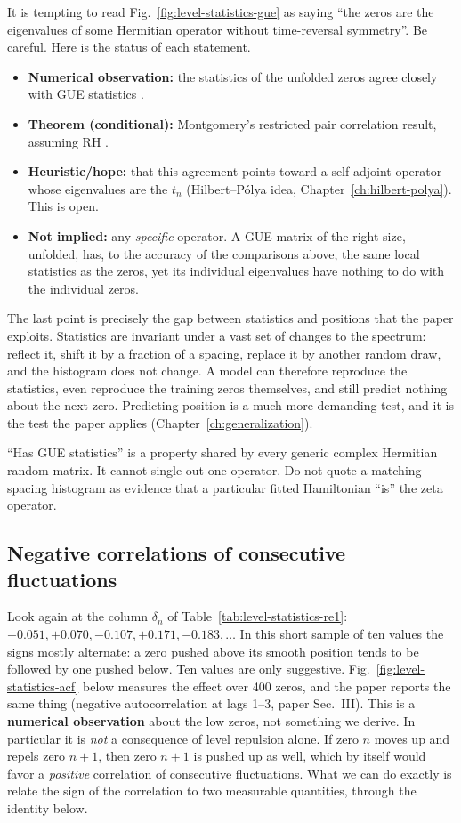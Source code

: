It is tempting to read Fig.~\ref{fig:level-statistics-gue} as saying ``the zeros are the eigenvalues of some Hermitian operator without time-reversal symmetry''. Be careful. Here is the status of each statement.
\begin{itemize}
\item \textbf{Numerical observation:} the statistics of the unfolded zeros agree closely with GUE statistics \cite{odlyzko87}.
\item \textbf{Theorem (conditional):} Montgomery's restricted pair correlation result, assuming RH \cite{montgomery}.
\item \textbf{Heuristic/hope:} that this agreement points toward a self-adjoint operator whose eigenvalues are the $t_n$ (Hilbert--P\'olya idea, Chapter~\ref{ch:hilbert-polya}). This is open.
\item \textbf{Not implied:} any \emph{specific} operator. A GUE matrix of the right size, unfolded, has, to the accuracy of the comparisons above, the same local statistics as the zeros, yet its individual eigenvalues have nothing to do with the individual zeros.
\end{itemize}
The last point is precisely the gap between statistics and positions that the paper exploits. Statistics are invariant under a vast set of changes to the spectrum: reflect it, shift it by a fraction of a spacing, replace it by another random draw, and the histogram does not change. A model can therefore reproduce the statistics, even reproduce the training zeros themselves, and still predict nothing about the next zero. Predicting position is a much more demanding test, and it is the test the paper applies (Chapter~\ref{ch:generalization}).

\begin{pitfall}
``Has GUE statistics'' is a property shared by every generic complex Hermitian random matrix. It cannot single out one operator. Do not quote a matching spacing histogram as evidence that a particular fitted Hamiltonian ``is'' the zeta operator.
\end{pitfall}

\subsection{Negative correlations of consecutive fluctuations}

Look again at the column $\delta_n$ of Table~\ref{tab:level-statistics-re1}: $-0.051,+0.070,-0.107,+0.171,-0.183,\dots$ In this short sample of ten values the signs mostly alternate: a zero pushed above its smooth position tends to be followed by one pushed below. Ten values are only suggestive. Fig.~\ref{fig:level-statistics-acf} below measures the effect over 400 zeros, and the paper reports the same thing (negative autocorrelation at lags 1--3, paper Sec.~III). This is a \textbf{numerical observation} about the low zeros, not something we derive. In particular it is \emph{not} a consequence of level repulsion alone. If zero $n$ moves up and repels zero $n+1$, then zero $n+1$ is pushed up as well, which by itself would favor a \emph{positive} correlation of consecutive fluctuations. What we can do exactly is relate the sign of the correlation to two measurable quantities, through the identity below.

